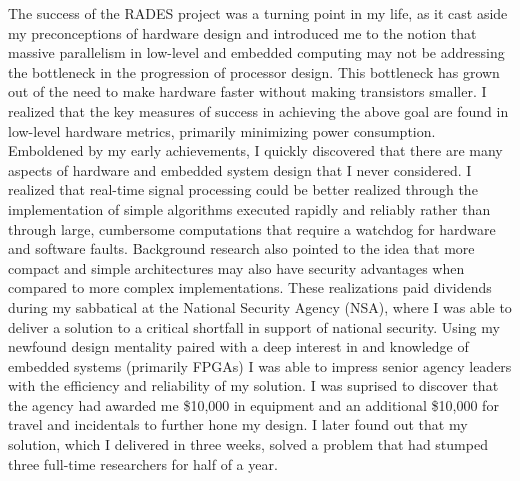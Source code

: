 \documentclass{article}
\begin{document}
The success of the RADES project was a turning point in my life, as it cast
aside my preconceptions of hardware design and introduced me to the notion that
massive parallelism in low-level and embedded computing may not be addressing
the bottleneck in the progression of processor design. This bottleneck has
grown out of the need to make hardware faster without making transistors
smaller. I realized that the key measures of success in achieving the above
goal are found in low-level hardware metrics, primarily minimizing power
consumption. Emboldened by my early achievements, I quickly discovered that
there are many aspects of hardware and embedded system design that I never
considered. I realized that real-time signal processing could be better
realized through the implementation of simple algorithms executed rapidly and
reliably rather than through large, cumbersome computations that require a
watchdog for hardware and software faults. Background research also pointed
to the idea that more compact and simple architectures may also have security
advantages when compared to more complex implementations. These realizations paid dividends
during my sabbatical at the National Security Agency (NSA), where I was able to
deliver a solution to a critical shortfall in support of national security.
Using my newfound design mentality paired with a deep interest in and knowledge of
embedded systems (primarily FPGAs) I was able to impress senior agency leaders
with the efficiency and reliability of my solution. I was suprised to discover
that the agency had awarded me \$10,000 in equipment and an additional \$10,000
for travel and incidentals to further hone my design. I later found out that my
solution, which I delivered in three weeks, solved a problem that had stumped
three full-time researchers for half of a year. 
\end{document}
